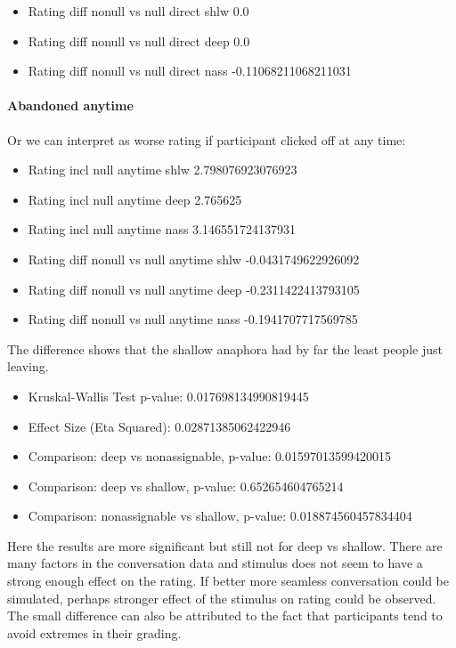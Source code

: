 \begin{itemize}
\item Rating diff nonull vs null direct shlw 0.0
\item Rating diff nonull vs null direct deep 0.0
\item Rating diff nonull vs null direct nass -0.11068211068211031
\end{itemize}

\paragraph{Abandoned anytime}

Or we can interpret as worse rating if participant clicked off at any time:

\begin{itemize}
\item Rating incl null anytime shlw 2.798076923076923
\item Rating incl null anytime deep 2.765625
\item Rating incl null anytime nass 3.146551724137931
\end{itemize}

\begin{itemize}
\item Rating diff nonull vs null anytime shlw -0.0431749622926092
\item Rating diff nonull vs null anytime deep -0.2311422413793105
\item Rating diff nonull vs null anytime nass -0.1941707717569785
\end{itemize}

The difference shows that the shallow anaphora had by far the least people just leaving.

\begin{itemize}
\item Kruskal-Wallis Test p-value: 0.017698134990819445
\item Effect Size (Eta Squared): 0.02871385062422946
\item Comparison: deep vs nonassignable, p-value: 0.01597013599420015
\item Comparison: deep vs shallow, p-value: 0.652654604765214
\item Comparison: nonassignable vs shallow, p-value: 0.018874560457834404
\end{itemize}

Here the results are more significant but still not for deep vs shallow.
There are many factors in the conversation data and
stimulus does not seem to have a strong enough effect on the rating.
If better more seamless conversation could be simulated,
perhaps stronger effect of the stimulus on rating could be observed.
The small difference can also be attributed to the fact that participants tend to
avoid extremes in their grading.

